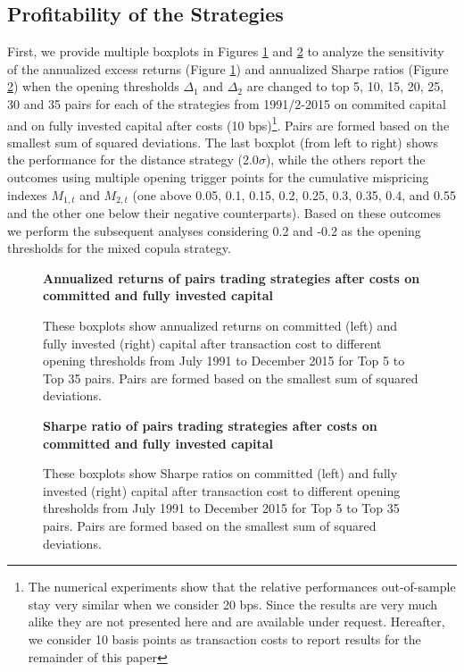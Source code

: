\documentclass[a4paper]{article}
\begin{document}
	\vspace{0.3cm}
	
	
	\subsection{Profitability of the Strategies}
	
First, we provide multiple boxplots in Figures \ref{fig:fig25} and \ref{fig:fig42} to analyze the sensitivity of the annualized excess returns (Figure \ref{fig:fig25}) and annualized Sharpe ratios (Figure \ref{fig:fig42}) when the opening thresholds $\Delta_{1}$ and $\Delta_{2}$ are changed to top 5, 10, 15, 20, 25, 30 and 35 pairs for each of the strategies from 1991/2-2015 on commited capital and on fully invested capital after costs (10 bps)\footnote{The numerical experiments show that the relative performances out-of-sample stay very similar when we consider 20 bps. Since the results are very much alike they are not presented here and are available under request. Hereafter, we consider 10 basis points as transaction costs to report results for the remainder of this paper}. Pairs are formed based on the smallest sum of squared deviations. The last boxplot (from left to right) shows the performance for the distance strategy (2.0$\sigma$), while the others report the outcomes using multiple opening trigger points for the cumulative mispricing indexes $M_{1,t}$ and $M_{2,t}$ (one above 0.05, 0.1, 0.15, 0.2, 0.25, 0.3, 0.35, 0.4, and 0.55 and the other one below their negative counterparts). Based on these outcomes we perform the subsequent analyses considering 0.2 and -0.2 as the opening thresholds for the mixed copula strategy.

\begin{figure}[H]
	\centering
		\resizebox{\linewidth}{!}{}
		\captionsetup{justification=raggedright,
		singlelinecheck=false
	}
	\caption{\textbf{Annualized returns of pairs trading strategies after costs on committed and fully invested capital}}
	\caption*{\scriptsize These boxplots show annualized returns on committed (left) and fully invested (right) capital after transaction cost to different opening thresholds from July 1991 to December 2015 for Top 5 to Top 35 pairs. Pairs are formed based on the smallest sum of squared deviations.}
	\label{fig:fig25}
\end{figure}

\begin{figure}[H]
	\centering
	\resizebox{\linewidth}{!}{}
	\captionsetup{justification=raggedright,
		singlelinecheck=false
	}
	\caption{\textbf {Sharpe ratio of pairs trading strategies after costs on committed and fully invested capital}}
	\caption*{\justifying \scriptsize These boxplots show Sharpe ratios on committed (left) and fully invested (right) capital after transaction cost to different opening thresholds from July 1991 to December 2015 for Top 5 to Top 35 pairs. Pairs are formed based on the smallest sum of squared deviations.}
	\label{fig:fig42}
\end{figure}
\end{document}
